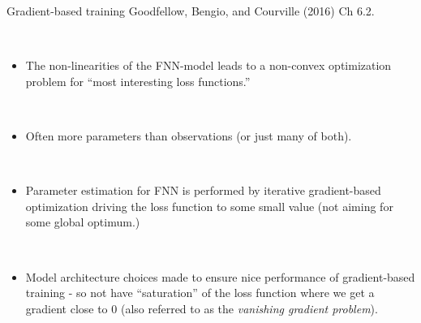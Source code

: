 \documentclass[
  ignorenonframetext,
]{beamer}
\providecommand{\tightlist}{%
  \setlength{\itemsep}{0pt}\setlength{\parskip}{0pt}}
\begin{document}
\begin{frame}
\begin{block}{Gradient-based training}
\protect\hypertarget{gradient-based-training}{}
Goodfellow, Bengio, and Courville (2016) Ch 6.2.

\(~\)

\begin{itemize}
\tightlist
\item
  The non-linearities of the FNN-model leads to a non-convex
  optimization problem for ``most interesting loss functions.''
\end{itemize}

\(~\)

\begin{itemize}
\tightlist
\item
  Often more parameters than observations (or just many of both).
\end{itemize}

\(~\)

\begin{itemize}
\tightlist
\item
  Parameter estimation for FNN is performed by iterative gradient-based
  optimization driving the loss function to some small value (not aiming
  for some global optimum.)
\end{itemize}

\(~\)

\begin{itemize}
\tightlist
\item
  Model architecture choices made to ensure nice performance of
  gradient-based training - so not have ``saturation'' of the loss
  function where we get a gradient close to 0 (also referred to as the
  \emph{vanishing gradient problem}).
\end{itemize}
\end{block}
\end{frame}
\end{document}
